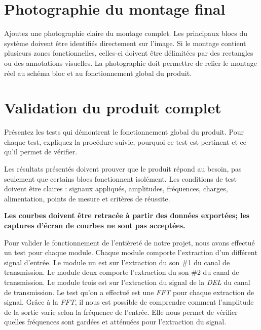 \documentclass[11pt,letterpaper]{article}
\begin{document}
\clearpage
\section{Photographie du montage final}
Ajoutez une photographie claire du montage complet. Les principaux blocs du système doivent être identifiés directement sur l'image. Si le montage contient plusieurs zones fonctionnelles, celles-ci doivent être délimitées par des rectangles ou des annotations visuelles. La photographie doit permettre de relier le montage réel au schéma bloc et au fonctionnement global du produit.


\clearpage
\section{Validation du produit complet}
Présentez les tests qui démontrent le fonctionnement global du produit. Pour chaque test, expliquez la procédure suivie, pourquoi ce test est pertinent et ce qu'il permet de vérifier.

Les résultats présentés doivent prouver que le produit répond au besoin, pas seulement que certains blocs fonctionnent isolément. Les conditions de test doivent être claires : signaux appliqués, amplitudes, fréquences, charges, alimentation, points de mesure et critères de réussite.

\textbf{Les courbes doivent être retracée à partir des données exportées; les captures d'écran de courbes ne sont pas acceptées.}

Pour valider le fonctionnement de l'entièreté de notre projet, nous avons effectué un test pour chaque module. Chaque module comporte l'extraction d'un différent signal d'entrée. Le module un est sur  l'extraction du son \#1 du canal de transmission. Le module deux comporte l'extraction du son \#2 du canal de transmission. Le module trois est sur l'extraction du signal de la \textit{DEL} du canal de transmission. Le test qu'on a effectué est une \textit{FFT} pour chaque extraction de signal. Grâce à la \textit{FFT}, il nous est possible de comprendre comment l'amplitude de la sortie varie selon la fréquence de l'entrée. Elle nous permet de vérifier quelles fréquences sont gardées et atténuées pour l'extraction du signal.
\end{document}
